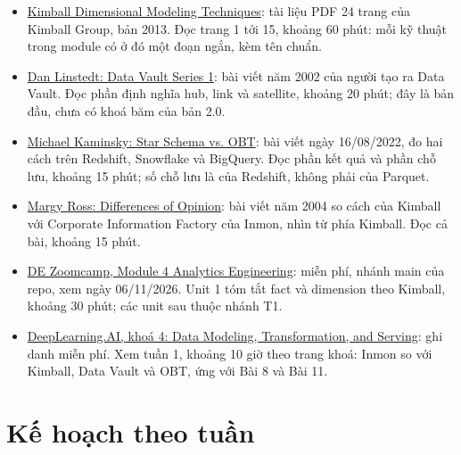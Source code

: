 \begin{itemize}
  \item \href{https://www.kimballgroup.com/wp-content/uploads/2013/08/2013.09-Kimball-Dimensional-Modeling-Techniques11.pdf}{Kimball Dimensional Modeling Techniques}: tài liệu PDF 24 trang của Kimball Group, bản 2013. Đọc trang 1 tới 15, khoảng 60 phút: mỗi kỹ thuật trong module có ở đó một đoạn ngắn, kèm tên chuẩn.
  \item \href{https://dataversity.net/data-vault-series-1-data-vault-overview/5054}{Dan Linstedt: Data Vault Series 1}: bài viết năm 2002 của người tạo ra Data Vault. Đọc phần định nghĩa hub, link và satellite, khoảng 20 phút; đây là bản đầu, chưa có khoá băm của bản 2.0.
  \item \href{https://www.fivetran.com/blog/star-schema-vs-obt}{Michael Kaminsky: Star Schema vs. OBT}: bài viết ngày 16/08/2022, đo hai cách trên Redshift, Snowflake và BigQuery. Đọc phần kết quả và phần chỗ lưu, khoảng 15 phút; số chỗ lưu là của Redshift, không phải của Parquet.
  \item \href{https://decisionworks.com/2004/03/differences-of-opinion/}{Margy Ross: Differences of Opinion}: bài viết năm 2004 so cách của Kimball với Corporate Information Factory của Inmon, nhìn từ phía Kimball. Đọc cả bài, khoảng 15 phút.
  \item \href{https://github.com/DataTalksClub/data-engineering-zoomcamp/tree/main/04-analytics-engineering}{DE Zoomcamp, Module 4 Analytics Engineering}: miễn phí, nhánh main của repo, xem ngày 06/11/2026. Unit 1 tóm tắt fact và dimension theo Kimball, khoảng 30 phút; các unit sau thuộc nhánh T1.
  \item \href{https://www.coursera.org/learn/data-modeling-transformation-serving}{DeepLearning.AI, khoá 4: Data Modeling, Transformation, and Serving}: ghi danh miễn phí. Xem tuần 1, khoảng 10 giờ theo trang khoá: Inmon so với Kimball, Data Vault và OBT, ứng với Bài 8 và Bài 11.
\end{itemize}

\section{Kế hoạch theo tuần}

